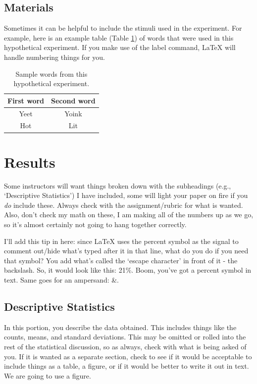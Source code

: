 \documentclass[stu,12pt,floatsintext,a4paper]{apa7}
\begin{document}
\subsection{Materials}


Sometimes it can be helpful to include the stimuli used in the experiment. For example, here is an example table (Table \ref{tab:table_words}) of words that were used in this hypothetical experiment. If you make use of the label command, \LaTeX{} will handle numbering things for you.

\begin{table}
    \caption{Sample words from this hypothetical experiment.}
    \centering
    \begin{tabular}{cc} %
        \hline 
         First word & Second word \\
         \hline
         Yeet & Yoink \\
         Hot & Lit \\
         \hline
    \end{tabular}
    \label{tab:table_words}
\end{table}

\section{Results}

Some instructors will want things broken down with the subheadings (e.g., `Descriptive Statistics') I have included, some will light your paper on fire if you \textit{do} include these. Always check with the assignment/rubric for what is wanted. Also, don't check my math on these, I am making all of the numbers up as we go, so it's almost certainly not going to hang together correctly.

I'll add this tip in here: since \LaTeX{} uses the percent symbol as the signal to comment out/hide what's typed after it in that line, what do you do if you need that symbol? You add what's called the `escape character' in front of it - the backslash. So, it would look like this: 21\%. Boom, you've got a percent symbol in text. Same goes for an ampersand: \&.

\subsection{Descriptive Statistics}

In this portion, you describe the data obtained. This includes things like the counts, means, and standard deviations. This may be omitted or rolled into the rest of the statistical discussion, so as always, check with what is being asked of you. If it is wanted as a separate section, check to see if it would be acceptable to include things as a table, a figure, or if it would be better to write it out in text. We are going to use a figure.
\end{document}

